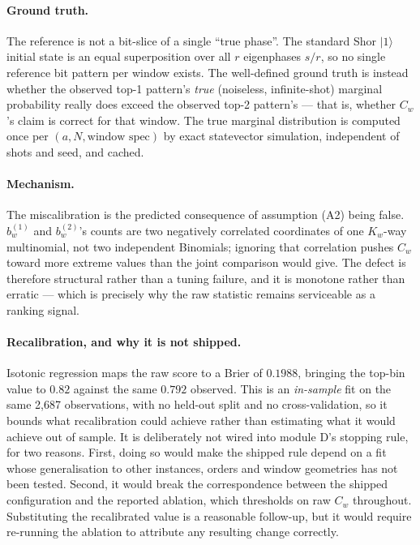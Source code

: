 \documentclass[preprint,11pt]{elsarticle}
\newcommand{\Cw}{C_w}
\begin{document}
\paragraph{Ground truth.} The reference is not a bit-slice of a single
``true phase''. The standard Shor $|1\rangle$ initial state is an equal
superposition over all $r$ eigenphases $s/r$, so no single reference bit
pattern per window exists. The well-defined ground truth is instead
whether the observed top-1 pattern's \emph{true} (noiseless,
infinite-shot) marginal probability really does exceed the observed
top-2 pattern's --- that is, whether $\Cw$'s claim is correct for that
window. The true marginal distribution is computed once per
$(a,N,\text{window spec})$ by exact statevector simulation, independent
of shots and seed, and cached.

\paragraph{Mechanism.} The miscalibration is the predicted consequence of
assumption (A2) being false. $b^{(1)}_w$ and $b^{(2)}_w$'s counts are two
negatively correlated coordinates of one $K_w$-way multinomial, not two
independent Binomials; ignoring that correlation pushes $\Cw$ toward more
extreme values than the joint comparison would give. The defect is
therefore structural rather than a tuning failure, and it is monotone
rather than erratic --- which is precisely why the raw statistic remains
serviceable as a ranking signal.

\paragraph{Recalibration, and why it is not shipped.} Isotonic regression
\cite{zadrozny2002} maps the raw score to a Brier of $0.1988$, bringing
the top-bin value to $0.82$ against the same $0.792$ observed. This is an
\emph{in-sample} fit on the same 2{,}687 observations, with no held-out
split and no cross-validation, so it bounds what recalibration could
achieve rather than estimating what it would achieve out of sample. It is
deliberately not wired into module D's stopping rule, for two reasons.
First, doing so would make the shipped rule depend on a fit whose
generalisation to other instances, orders and window geometries has not
been tested. Second, it would break the correspondence between the
shipped configuration and the reported ablation, which thresholds on raw
$\Cw$ throughout. Substituting the recalibrated value is a reasonable
follow-up, but it would require re-running the ablation to attribute any
resulting change correctly.
\end{document}
